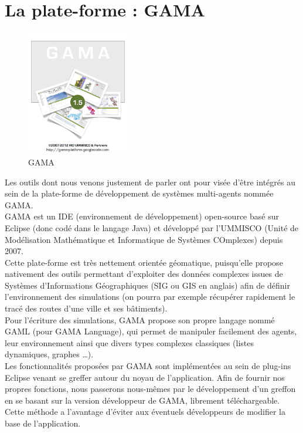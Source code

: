 \documentclass[11pt]{report} %
\begin{document}
\chapter{La plate-forme : GAMA}
\begin{figure}
\includegraphics[width=0.4\textwidth]{images/gaml-logo.png}%
\caption{GAMA}%
\end{figure}
Les outils dont nous venons justement de parler ont pour vis\'ee d'\^etre int\'egr\'es au sein de la plate-forme de d\'eveloppement de syst\`emes multi-agents nomm\'ee GAMA.\\
GAMA est un IDE (environnement de d\'eveloppement) open-source bas\'e sur Eclipse (donc cod\'e dans le langage Java) et d\'evelopp\'e par l'UMMISCO (Unit\'e de Mod\'elisation Math\'ematique et Informatique de Syst\`emes COmplexes) depuis 2007.\\
Cette plate-forme est tr\`es nettement orient\'ee g\'eomatique, puisqu'elle propose nativement des outils permettant d'exploiter des donn\'ees complexes issues de Syst\`emes d'Informations G\'eographiques (SIG ou GIS en anglais) afin de d\'efinir l'environnement des simulations (on pourra par exemple r\'ecup\'erer rapidement le trac\'e des routes d'une ville et ses bâtiments).\\
Pour l'\'ecriture des simulations, GAMA propose son propre langage nomm\'e GAML (pour GAMA Language), qui permet de manipuler facilement des agents, leur environnement ainsi que divers types complexes classiques (listes dynamiques, graphes …).\\
Les fonctionnalit\'es propos\'ees par GAMA sont impl\'ement\'ees au sein de plug-ins Eclipse venant se greffer autour du noyau de l'application. Afin de fournir nos propres fonctions, nous passerons nous-m\^emes par le d\'eveloppement d'un greffon en se basant sur la version d\'eveloppeur de GAMA, librement t\'el\'echargeable. Cette m\'ethode a l'avantage d'\'eviter aux \'eventuels d\'eveloppeurs de modifier la base de l'application.
\end{document}
